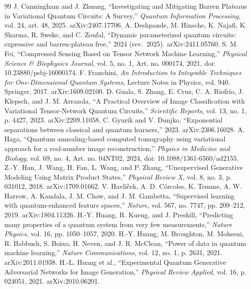 \documentclass[11pt]{article}
\begin{document}
\begin{thebibliography}{99}
 J. Cunningham and J. Zhuang, ``Investigating and Mitigating Barren Plateaus in Variational Quantum Circuits: A Survey,'' \textit{Quantum Information Processing}, vol. 24, art. 48, 2025. arXiv:2407.17706.
 A. Deshpande, M. Hinsche, K. Najafi, K. Sharma, R. Sweke, and C. Zoufal, ``Dynamic parameterized quantum circuits: expressive and barren-plateau free,'' 2024 (rev.\ 2025). arXiv:2411.05760.
 S. M. Fei, ``Compressed Sensing Based on Tensor Network Machine Learning,'' \textit{Physical Science \& Biophysics Journal}, vol. 5, no. 1, Art. no. 000174, 2021, doi: 10.23880/psbj-16000174.
 F. Franchini, \textit{An Introduction to Integrable Techniques for One-Dimensional Quantum Systems}, Lecture Notes in Physics, vol. 940. Springer, 2017. arXiv:1609.02100.
 D. Guala, S. Zhang, E. Cruz, C. A. Riofr\'io, J. Klepsch, and J. M. Arrazola, ``A Practical Overview of Image Classification with Variational Tensor-Network Quantum Circuits,'' \textit{Scientific Reports}, vol. 13, no. 1, p. 4427, 2023. arXiv:2209.11058.
 C. Gyurik and V. Dunjko, ``Exponential separations between classical and quantum learners,'' 2023. arXiv:2306.16028.
 A. Haga, ``Quantum annealing-based computed tomography using variational approach for a real-number image reconstruction,'' \textit{Physics in Medicine and Biology}, vol. 69, no. 4, Art. no. 04NT02, 2024, doi: 10.1088/1361-6560/ad2155.
 Z.-Y. Han, J. Wang, H. Fan, L. Wang, and P. Zhang, ``Unsupervised Generative Modeling Using Matrix Product States,'' \textit{Physical Review X}, vol. 8, no. 3, p. 031012, 2018. arXiv:1709.01662.
 V. Havl{\'i}{\v c}ek, A. D. C{\'o}rcoles, K. Temme, A. W. Harrow, A. Kandala, J. M. Chow, and J. M. Gambetta, ``Supervised learning with quantum-enhanced feature spaces,'' \textit{Nature}, vol. 567, no. 7747, pp. 209--212, 2019. arXiv:1804.11326.
 H.-Y. Huang, R. Kueng, and J. Preskill, ``Predicting many properties of a quantum system from very few measurements,'' \textit{Nature Physics}, vol. 16, pp. 1050--1057, 2020.
 H.-Y. Huang, M. Broughton, M. Mohseni, R. Babbush, S. Boixo, H. Neven, and J. R. McClean, ``Power of data in quantum machine learning,'' \textit{Nature Communications}, vol. 12, no. 1, p. 2631, 2021. arXiv:2011.01938.
 H.-L. Huang et al., ``Experimental Quantum Generative Adversarial Networks for Image Generation,'' \textit{Physical Review Applied}, vol. 16, p. 024051, 2021. arXiv:2010.06201.

\end{thebibliography}
\end{document}
